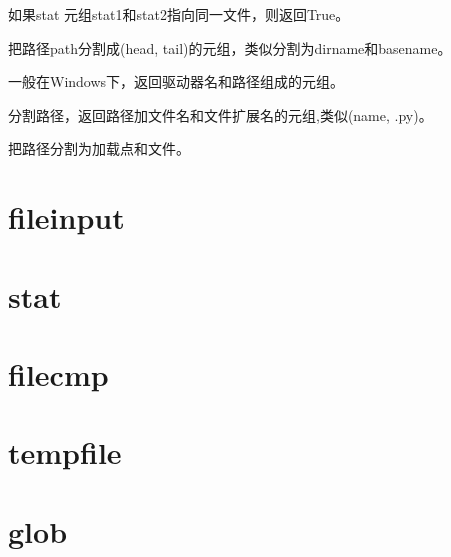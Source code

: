 \noindent{\color{red}{os.path.samestat(stat1, stat2):}}
\par{如果stat 元组stat1和stat2指向同一文件，则返回True。}\\

\noindent{\color{red}{os.path.split(path):}}
\par{把路径path分割成(head, tail)的元组，类似分割为dirname和basename。}\\

\noindent{\color{red}{os.path.splitdrive(path):}}
\par{一般在Windows下，返回驱动器名和路径组成的元组。}\\

\noindent{\color{red}{os.path.splitext(path):}}
\par{分割路径，返回路径加文件名和文件扩展名的元组,类似(name, .py)。}\\

\noindent{\color{red}{os.path.splitunc(path):}}
\par{把路径分割为加载点和文件。}\\





\section{fileinput}





\section{stat}





\section{filecmp}





\section{tempfile}





\section{glob}





